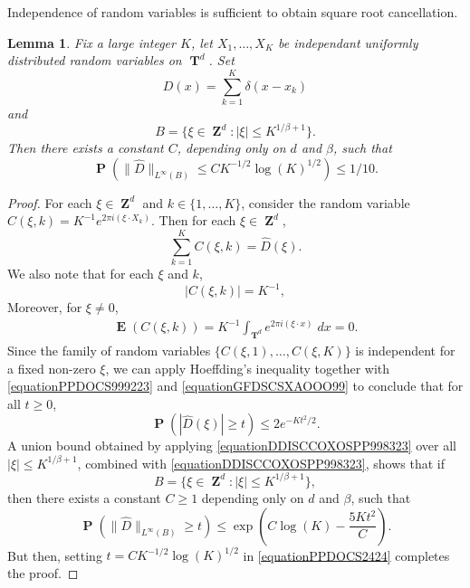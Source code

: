 \documentclass[12pt,reqno]{article}
\numberwithin{equation}{section}
\DeclareMathOperator{\ZZ}{\mathbf{Z}}
\DeclareMathOperator{\TT}{\mathbf{T}}
\newtheorem{lemma}[theorem]{Lemma}
\DeclareMathOperator{\EE}{\mathbf{E}}
\DeclareMathOperator{\PP}{\mathbf{P}}
\begin{document}
Independence of random variables is sufficient to obtain square root cancellation.

\begin{lemma} \label{LemmaGISCICS1}
    Fix a large integer $K$, let $X_1, \dots, X_K$ be independant uniformly distributed random variables on $\TT^d$. Set
    \[ D(x) = \sum_{k = 1}^K \delta(x - x_k) \]
    and
    \[ B = \{ \xi \in \ZZ^d: |\xi| \leq K^{1/\beta + 1} \}. \]
    Then there exists a constant $C$, depending only on $d$ and $\beta$, such that
    \[ \PP \left( \| \widehat{D} \|_{L^\infty(B)} \leq C K^{-1/2} \log(K)^{1/2} \right) \leq 1/10. \]
\end{lemma}
\begin{proof}
    For each $\xi \in \ZZ^d$ and $k \in \{ 1, \dots, K \}$, consider the random variable $C(\xi,k) = K^{-1} e^{2 \pi i (\xi \cdot X_k)}$. Then for each $\xi \in \ZZ^d$,
    \begin{equation} \label{equationPPDOCS999223}
        \sum_{k = 1}^K C(\xi,k) = \widehat{D}(\xi).
    \end{equation}
    We also note that for each $\xi$ and $k$,
    \begin{equation} \label{equationGFDSCSXAOOO99}
        |C(\xi,k)| = K^{-1},
    \end{equation}
    Moreover, for $\xi \neq 0$,
    \begin{align*}
        \EE(C(\xi,k)) = K^{-1} \int_{\TT^d} e^{2 \pi i (\xi \cdot x)}\; dx = 0.
    \end{align*}
    Since the family of random variables $\{ C(\xi,1), \dots, C(\xi,K) \}$ is independent for a fixed non-zero $\xi$, we can apply Hoeffding's inequality together with \eqref{equationPPDOCS999223} and \eqref{equationGFDSCSXAOOO99} to conclude that for all $t \geq 0$,
    \begin{equation} \label{equationDDISCCOXOSPP998323}
        \PP \left( |\widehat{D}(\xi)| \geq t \right) \leq 2 e^{-Kt^2/2}.
    \end{equation}
    A union bound obtained by applying \eqref{equationDDISCCOXOSPP998323} over all $|\xi| \leq K^{1/\beta+1}$, combined with \eqref{equationDDISCCOXOSPP998323}, shows that if
    \[ B = \{ \xi \in \ZZ^d : |\xi| \leq K^{1/\beta + 1} \}, \]
    then there exists a constant $C \geq 1$ depending only on $d$ and $\beta$, such that
    \begin{equation} \label{equationPPDOCS2424}
        \PP \left( \| \widehat{D} \|_{L^\infty(B)} \geq t \right) \leq \exp \left( C \log(K) - \frac{5K t^2}{C} \right).
    \end{equation}
    But then, setting $t = CK^{-1/2} \log(K)^{1/2}$ in \eqref{equationPPDOCS2424} completes the proof.
\end{proof}
\end{document}
